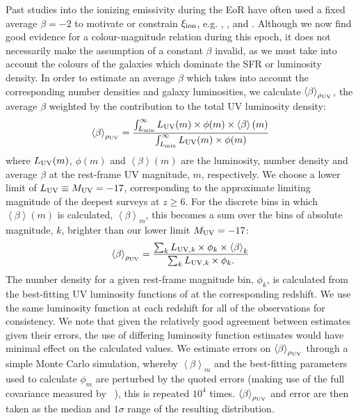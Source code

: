 Past studies into the ionizing emissivity during the EoR have often used a fixed average $\beta = -2$ to motivate or constrain $\xi_{\rm{ion}}$, e.g. \citet{Bolton:2007gc}, \citet{Ouchi:2009jd}, \citet{2010Natur.468...49R,Robertson:2013ji} and \citet{Kuhlen:2012ka}. Although we now find good evidence for a colour-magnitude relation during this epoch, it does not necessarily make the assumption of a constant $\beta$ invalid, as we must take into account the colours of the galaxies which dominate the SFR or luminosity density. In order to estimate an average $\beta$ which takes into account the corresponding number densities and galaxy luminosities, we calculate $\left \langle \beta  \right \rangle_{\rho_{\rm{UV}}}$, the average $\beta$ weighted by the contribution to the total UV luminosity density:
\begin{equation}
\left \langle \beta  \right \rangle_{\rho_{\rm{UV}}} = \frac{\int_{L_{\rm{min}}}^{\infty}  L_{\rm{UV}}(m) \times \phi(m) \times \left \langle \beta  \right \rangle (m)}{\int_{L_{\rm{min}}}^{\infty} L_{\rm{UV}}(m) \times \phi(m)}
\end{equation}
\noindent where $L_{\rm{UV}}(m)$, $\phi(m)$ and $\left \langle \beta  \right \rangle (m)$ are the luminosity, number density and average $\beta$ at the rest-frame UV magnitude, $m$, respectively. We choose a lower limit of $L_{\rm{UV}} \equiv M_{\rm{UV}} = -17$, corresponding to the approximate limiting magnitude of the deepest surveys at $z\geq6$. For the discrete bins in which $\left \langle \beta  \right \rangle (m)$ is calculated, $\left \langle \beta  \right \rangle_{m}$, this becomes a sum over the bins of absolute magnitude, $k$, brighter than our lower limit $M_{\rm{UV}} = -17$:
\begin{equation}
\left \langle \beta  \right \rangle_{\rho_{\rm{UV}}} = \frac{\sum_{k}^{ }  L_{\rm{UV}, \mathit{k}} \times \phi_{k} \times \left \langle \beta  \right \rangle_{k}}{\sum_{k}^{ } L_{\rm{UV},  \mathit{k}} \times \phi_{k}.}
\end{equation}
\noindent The number density for a given rest-frame magnitude bin, $\phi_{k}$, is calculated from the best-fitting UV luminosity functions of \citet{Bouwens:2014tx} at the corresponding redshift. We use the same luminosity function at each redshift for all of the observations for consistency. We note that given the relatively good agreement between estimates given their errors, the use of differing luminosity function estimates would have minimal effect on the calculated values. We estimate errors on $\left \langle \beta  \right \rangle_{\rho_{\rm{UV}}}$ through a simple Monte Carlo simulation, whereby $\left \langle \beta  \right \rangle_{m}$ and the best-fitting \citet{Schechter:1976gl} parameters used to calculate $\phi_{m}$ are perturbed by the quoted errors (making use of the full covariance measured by \citeauthor{Bouwens:2014tx}~\citeyear{Bouwens:2014tx}), this is repeated $10^{4}$ times. $\left \langle \beta  \right \rangle_{\rho_{\rm{UV}}}$ and error are then taken as the median and $1\sigma$ range of the resulting distribution.

